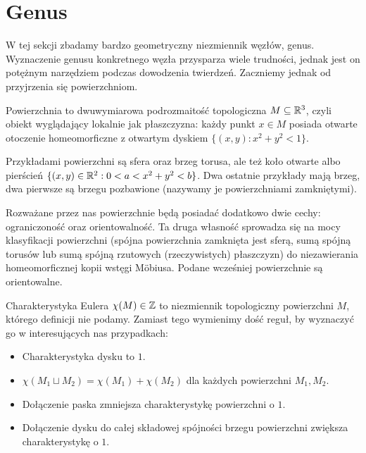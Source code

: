\section{Genus} %
\label{sec:genus}
W tej sekcji zbadamy bardzo geometryczny niezmiennik węzłów, genus.
Wyznaczenie genusu konkretnego węzła przysparza wiele trudności, jednak jest on potężnym narzędziem podczas dowodzenia twierdzeń.
Zaczniemy jednak od przyjrzenia się powierzchniom.

\begin{definition}
    Powierzchnia to dwuwymiarowa podrozmaitość topologiczna $M \subseteq \mathbb R^3$, czyli obiekt wyglądający lokalnie jak płaszczyzna: każdy punkt $x \in M$ posiada otwarte otoczenie homeomorficzne z otwartym dyskiem $\{(x,y) : x^2 + y^2 < 1\}$.
\end{definition}

Przykładami powierzchni są sfera oraz brzeg torusa, ale też koło otwarte albo pierścień $\{(x, y) \in \mathbb R^2 : 0 < a < x^2 + y^2 < b\}$.
Dwa ostatnie przykłady mają brzeg, dwa pierwsze są brzegu pozbawione (nazywamy je powierzchniami zamkniętymi).

Rozważane przez nas powierzchnie będą posiadać dodatkowo dwie cechy: ograniczoność oraz orientowalność.
Ta druga własność sprowadza się na mocy klasyfikacji powierzchni (spójna powierzchnia zamknięta jest sferą, sumą spójną torusów lub sumą spójną rzutowych (rzeczywistych) płaszczyzn) do niezawierania homeomorficznej kopii wstęgi Möbiusa.
Podane wcześniej powierzchnie są orientowalne.

\begin{definition}
    Charakterystyka Eulera $\chi(M) \in \mathbb Z$ to niezmiennik
    topologiczny powierzchni $M$, którego definicji nie podamy.
    Zamiast tego wymienimy dość reguł,
    by wyznaczyć go w interesujących nas przypadkach:
    \begin{itemize}
        \item Charakterystyka dysku to $1$.
        \item $\chi(M_1 \sqcup M_2)=\chi(M_1) + \chi(M_2)$ dla każdych powierzchni $M_1, M_2$.
        \item Dołączenie paska zmniejsza charakterystykę powierzchni o $1$.
        \item Dołączenie dysku do całej składowej spójności brzegu powierzchni zwiększa charakterystykę o $1$.
    \end{itemize}
\end{definition}

